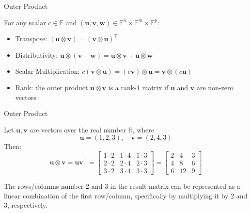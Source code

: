 \documentclass{zkdl-presentation-template}
\begin{document}
    \begin{frame}{Outer Product}
        \begin{lemma}
            For any scalar $c \in \mathbb{F}$ and $(\boldsymbol{u}, \boldsymbol{v}, \boldsymbol{w}) \in \mathbb{F}^n \times \mathbb{F}^m \times \mathbb{F}^p$:
            \begin{itemize}
                \item Transpose: $(\boldsymbol{u} \otimes \boldsymbol{v}) = (\boldsymbol{v} \otimes \boldsymbol{u})^{\textsf{T}}$
                \item Distributivity: $\boldsymbol{u} \otimes (\boldsymbol{v} + \boldsymbol{w}) = \boldsymbol{u} \otimes \boldsymbol{v} + \boldsymbol{u} \otimes \boldsymbol{w}$
                \item Scalar Multiplication: $c(\boldsymbol{v} \otimes \boldsymbol{u}) = (c\boldsymbol{v}) \otimes \boldsymbol{u} = \boldsymbol{v} \otimes (c\boldsymbol{u})$
                \item Rank: the outer product $\boldsymbol{u} \otimes \boldsymbol{v}$ is a rank-1 matrix if $\boldsymbol{u}$ and $\boldsymbol{v}$ are non-zero
                vectors
            \end{itemize}
        \end{lemma}
    \end{frame}

    \begin{frame}{Outer Product}
        \begin{example}
            Let $\boldsymbol{u}, \boldsymbol{v}$ are vectors over the real number $\mathbb{R}$, where
            \begin{equation*}
                \boldsymbol{u} = (1, 2, 3), \quad \boldsymbol{v} = (2, 4, 3)
            \end{equation*}
            Then: 
            \begin{equation*}
                \boldsymbol{u} \otimes \boldsymbol{v} = \boldsymbol{u}\boldsymbol{v}^{\top} = \begin{bmatrix}
                    1 \cdot 2 & 1 \cdot 4 & 1 \cdot 3 \\
                    2 \cdot 2 & 2 \cdot 4 & 2 \cdot 3 \\
                    3 \cdot 2 & 3 \cdot 4 & 3 \cdot 3
                \end{bmatrix} = \begin{bmatrix}
                    2 & 4 & 3 \\
                    4 & 8 & 6 \\
                    6 & 12 & 9
                \end{bmatrix}
            \end{equation*}

            
            The rows/columns number 2 and 3 in the result matrix can be represented as a linear 
            combination of the first row/column, specifically by multiplying it by 2 and 3, 
            respectively. 
        \end{example}
    \end{frame}
\end{document}

